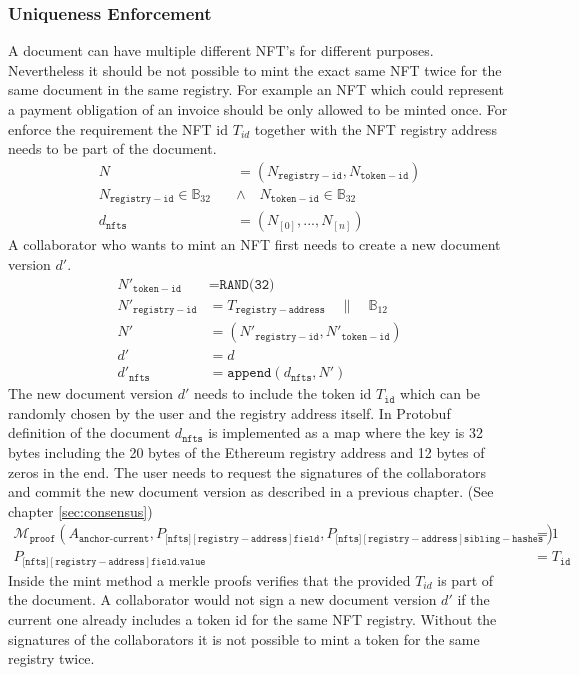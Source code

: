 \subsubsection{Uniqueness Enforcement}
A document can have multiple different NFT's for different purposes. Nevertheless it should be not possible to mint the exact same NFT twice for the same document in the same registry. For example an NFT which could represent a payment obligation of an invoice should be only allowed to be minted once. For enforce the requirement the NFT id $T_{id}$ together with the NFT registry address needs to be part of the document. 
\begin{equation}
\begin{split}
N & = (N_{\mathtt{registry-id}}, N_{\mathtt{token-id}}) \\
N_{\mathtt{registry-id}} \in \mathbb{B}_{32}  \quad &\land \quad N_{\mathtt{token-id}} \in \mathbb{B}_{32}  \\
d_{\mathtt{nfts}}& = (N_{[0]},...,N_{[n]})
\end{split}
\end{equation}
A collaborator who wants to mint an NFT first needs to create a new document version $d'$.
\begin{equation}
\begin{split}
N'_{\mathtt{token-id}} & = \texttt{RAND(32)}\\
N'_{\mathtt{registry-id}} & = T_{\mathtt{registry-address}} \quad \| \quad \mathbb{B}_{12} \\
N'  & = (N'_{\mathtt{registry-id}},N'_{\mathtt{token-id}}) \\
d' & = d \\
d'_{\mathtt{nfts}} & = \texttt{append}(d_{\mathtt{nfts}},N')
\end{split}
\end{equation}
The new document version $d'$ needs to include the token id $T_{\mathtt{id}}$ which can be randomly chosen by
the user and the registry address itself. In Protobuf definition of the document $d_{\mathtt{nfts}}$ is implemented as a map where the key is 32 bytes including the 20 bytes of the Ethereum registry address and 12 bytes of zeros in the end. The user needs to request the signatures of the collaborators and commit the new document version as described in a previous chapter. (See chapter \ref{sec:consensus})
\begin{equation}
\begin{split}
\mathcal{M}_{\texttt{proof}}(A_{\texttt{anchor-current}} ,P_{[\mathtt{nfts]{[registry-address]}}\mathtt{field}},P_{[\mathtt{nfts]{[registry-address]}}\mathtt{sibling-hashes}}) &= 1 \\
P_{[\mathtt{nfts]{[registry-address]}}\mathtt{field.value}} &= T_{\mathtt{id}}
\end{split}
\end{equation}
Inside the mint method a merkle proofs verifies that the provided $T_{id}$ is part of the document. A collaborator would not sign a new document version $d'$ if the current one already includes a token id for the same NFT registry. Without the signatures of the collaborators it is not possible to mint a token for the same registry twice.


